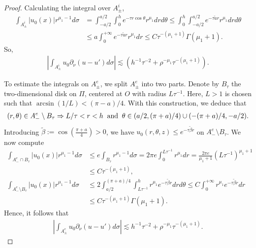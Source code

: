 ﻿\documentclass[11pt,reqno,oneside]{amsart}
\theoremstyle{definition}
\theoremstyle{remark}
\renewcommand{\b}{\beta}
\renewcommand{\t}{\theta}
\newcommand{\p}{\partial}
\begin{document}
\begin{proof}
            Calculating the integral over $A_\pm^i$,
            \begin{align*}
                \int_{A_\pm^i}|u_0(x)| r^{\mu_1-1}d\sigma &= \int_{-a/2}^{a/2}\int_0^h e^{-\tau r\cos \t} r^{\mu_1} dr d\t \leq  \int_0^h\int_{-a/2}^{a/2} e^{-\tau \widetilde{a} r} r^{\mu_1} dr d\t \\
                &\leq a \int_0^{+\infty} e^{-\tau \widetilde{a} r} r^{\mu_1} dr \leq C \tau ^{-(\mu_1+1)}\Gamma(\mu_1+1).
            \end{align*}
            So, 
            \begin{align}\label{eq:bound-Ai}
                \left|\int_{A_\pm^i} u_0 \p_\nu(u-u')d\sigma \right|\lesssim (h^{-1}\tau^{-2}+\rho^{-\mu_1}\tau^{-(\mu_1+1)}).
            \end{align}

            To estimate the integrals on $A_\pm^e$, we split $A_\pm^e$ into two parts. Denote by $B_{\tau}$ the two-dimensional disk on $\Pi$, centered at $O$ with radius $L\tau^{-1}$. Here, $L>1$ is chosen such that $\arcsin(1/L)<(\pi-a)/4$. With this construction, we deduce that
            \begin{align*}
                (r,\t)\in A_-^e\setminus B_{\tau} \Rightarrow L/\tau <r< h \;\; {\rm and}\;\; \t\in (a/2,(\pi+a)/4)\cup (-(\pi+a)/4,-a/2).
            \end{align*}
            Introducing $\widetilde{\b}:=\cos(\frac{\pi+a}{4})>0$, we have $u_0(r,\t,z)\leq e^{-\tau \widetilde{\b} r}$ on $A_-^e\setminus B_{\tau}$. We now compute
            \begin{align*}
                \int_{A_-^e\cap B_{\tau}} |u_0(x)|r^{\mu_1-1} d\sigma &\leq e\int_{B_{\tau}} r^{\mu_1-1} d\sigma= 2\pi e \int_0^{L\tau^{-1}} r^{\mu_1} dr = \frac{2\pi e}{\mu_1+1} (L\tau^{-1})^{\mu_1+1}\\
                &\leq C\tau^{-(\mu_1+1)},\\
                \int_{A_-^e\setminus B_{\tau}} |u_0(x)|r^{\mu_1-1} d\sigma &\leq 2\int_{a/2}^{(\pi+a)/4} \int_{L\tau^{-1}}^h r^{\mu_1} e^{-\tau \widetilde{\b} r} dr d\t \leq C \int_{0}^{+\infty} r^{\mu_1} e^{-\tau \widetilde{\b} r} dr \\
                &\leq C \tau^{-(\mu_1+1)}\Gamma(\mu_1+1).
            \end{align*}
            Hence, it follows that
            \begin{align}\label{eq:bound-Ae}
                \left|\int_{A_\pm^e} u_0 \p_\nu (u-u')d\sigma\right|\lesssim h^{-1}\tau^{-2}+\rho^{-\mu_1}\tau^{-(\mu_1+1)}.
            \end{align}
            

\end{proof}
\end{document}
